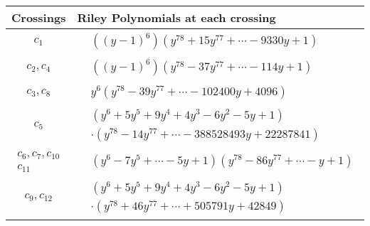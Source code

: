 \documentclass[1p]{elsarticle_modified}
\theoremstyle{definition}
\begin{document}
\begin{tabular}{m{50pt}|m{274pt}}
Crossings & \hspace{64pt}Riley Polynomials at each crossing \\
\hline $$\begin{aligned}c_{1}\end{aligned}$$&$\begin{aligned}
&((y-1)^6)(y^{78}+15 y^{77}+\cdots-9330 y+1)
\end{aligned}$\\
\hline $$\begin{aligned}c_{2},c_{4}\end{aligned}$$&$\begin{aligned}
&((y-1)^6)(y^{78}-37 y^{77}+\cdots-114 y+1)
\end{aligned}$\\
\hline $$\begin{aligned}c_{3},c_{8}\end{aligned}$$&$\begin{aligned}
&y^6(y^{78}-39 y^{77}+\cdots-102400 y+4096)
\end{aligned}$\\
\hline $$\begin{aligned}c_{5}\end{aligned}$$&$\begin{aligned}
&(y^6+5 y^5+9 y^4+4 y^3-6 y^2-5 y+1)\\
&\cdot(y^{78}-14 y^{77}+\cdots-388528493 y+22287841)
\end{aligned}$\\
\hline $$\begin{aligned}c_{6},c_{7},c_{10}\\c_{11}\end{aligned}$$&$\begin{aligned}
&(y^6-7 y^5+\cdots-5 y+1)(y^{78}-86 y^{77}+\cdots- y+1)
\end{aligned}$\\
\hline $$\begin{aligned}c_{9},c_{12}\end{aligned}$$&$\begin{aligned}
&(y^6+5 y^5+9 y^4+4 y^3-6 y^2-5 y+1)\\
&\cdot(y^{78}+46 y^{77}+\cdots+505791 y+42849)
\end{aligned}$\\
\hline
\end{tabular}
\vskip 2pc
\end{document}
